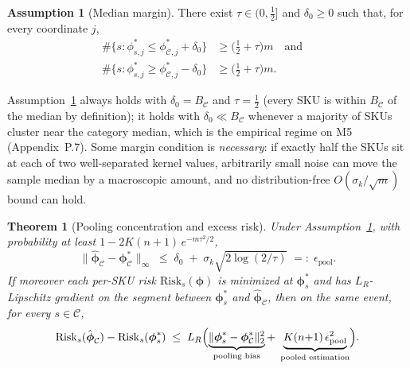 \documentclass[10pt]{article} %
\theoremstyle{plain}
\newtheorem{theorem}{Theorem}
\theoremstyle{definition}
\newtheorem{assumption}{Assumption}
\begin{document}
\begin{assumption}[Median margin]
\label{ass:margin}
There exist $\tau\in(0,\tfrac12]$ and $\delta_{0}\ge 0$ such that, for
every coordinate $j$,
\begin{align}
\#\bigl\{s : \phi^{*}_{s,j}\le \phi^{*}_{\mathcal{C},j}+\delta_{0}\bigr\}
&\ge \bigl(\tfrac12+\tau\bigr)m
\quad\text{and}\quad\nonumber\\
\#\bigl\{s : \phi^{*}_{s,j}\ge \phi^{*}_{\mathcal{C},j}-\delta_{0}\bigr\}
&\ge \bigl(\tfrac12+\tau\bigr)m .
\end{align}
\end{assumption}

Assumption~\ref{ass:margin} always holds with
$\delta_{0}=B_{\mathcal{C}}$ and $\tau=\tfrac12$ (every SKU is within
$B_{\mathcal{C}}$ of the median by definition); it holds with
$\delta_{0}\ll B_{\mathcal{C}}$ whenever a majority of SKUs cluster
near the category median, which is the empirical regime on M5
(Appendix~P.7). Some margin condition is \emph{necessary}: if exactly
half the SKUs sit at each of two well-separated kernel values,
arbitrarily small noise can move the sample median by a macroscopic
amount, and no distribution-free $O(\sigma_{k}/\sqrt{m})$ bound can
hold.

\begin{theorem}[Pooling concentration and excess risk]
\label{thm:pooling}
Under Assumption~\ref{ass:margin}, with probability at least
$1 - 2K(n{+}1)\,e^{-m\tau^{2}/2}$,
\begin{equation}
\bigl\|\hat{\boldsymbol{\phi}}_{\mathcal{C}}
-\boldsymbol{\phi}^{*}_{\mathcal{C}}\bigr\|_{\infty}
\;\le\;
\delta_{0} \;+\; \sigma_{k}\sqrt{2\log(2/\tau)}
\;=:\; \epsilon_{\mathrm{pool}} .
\label{eq:pool-conc}
\end{equation}
If moreover each per-SKU risk
$\mathrm{Risk}_{s}(\boldsymbol{\phi})$ is minimized at
$\boldsymbol{\phi}^{*}_{s}$ and has $L_{R}$-Lipschitz gradient on the
segment between $\boldsymbol{\phi}^{*}_{s}$ and
$\hat{\boldsymbol{\phi}}_{\mathcal{C}}$, then on the same event, for
every $s\in\mathcal{C}$,
\begin{equation}
\mathrm{Risk}_{s}(\hat{\boldsymbol{\phi}}_{\mathcal{C}})
-\mathrm{Risk}_{s}(\boldsymbol{\phi}^{*}_{s})
\;\le\;
L_{R}\Bigl(
\underbrace{\|\boldsymbol{\phi}^{*}_{s}
-\boldsymbol{\phi}^{*}_{\mathcal{C}}\|_{2}^{2}}_{\text{pooling bias}}
+\;
\underbrace{K(n{+}1)\,\epsilon_{\mathrm{pool}}^{2}}_{\text{pooled
estimation}}
\Bigr).
\label{eq:excess-risk}
\end{equation}
\end{theorem}
\end{document}

